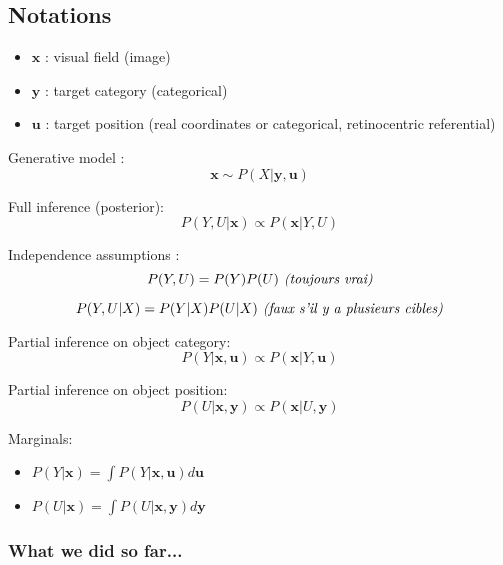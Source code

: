 


\subsection{Notations}
\begin{itemize}
	\item $\boldsymbol{x}$ : visual field (image)
	\item $\boldsymbol{y}$ : target category (categorical)
	\item $\boldsymbol{u}$ : target position (real coordinates or categorical, retinocentric referential)

\end{itemize}

Generative model :
$$ \boldsymbol{x} \sim P(X|\boldsymbol{y}, \boldsymbol{u}) $$

Full inference (posterior):
$$ P(Y, U|\boldsymbol{x}) \propto  P(\boldsymbol{x}|Y, U) $$

Independence assumptions :
\begin{equation}
P(Y, U) = P(Y)  P(U) \text{\emph{ (toujours vrai)}}
\label{eq:indep-1}
\end{equation}

\begin{equation}
P(Y, U|X) = P(Y|X)  P(U|X) \text{\emph{ (faux s'il y a plusieurs cibles)}}
\label{eq:indep-2}
\end{equation}

Partial inference on object category:
$$ P(Y|\boldsymbol{x}, \boldsymbol{u}) \propto  P(\boldsymbol{x}|Y, \boldsymbol{u}) $$

Partial inference on object position:
$$ P(U|\boldsymbol{x}, \boldsymbol{y}) \propto  P(\boldsymbol{x}|U, \boldsymbol{y}) $$

Marginals:
\begin{itemize}
\item $ P(Y|\boldsymbol{x}) = \int P(Y|\boldsymbol{x}, \boldsymbol{u}) d\boldsymbol{u}$
\item $ P(U|\boldsymbol{x}) = \int P(U|\boldsymbol{x}, \boldsymbol{y}) d\boldsymbol{y}$
\end{itemize}

\subsubsection{What we did so far...}

